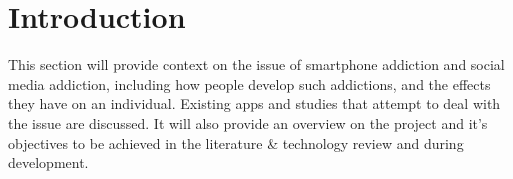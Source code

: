 \documentclass[12pt]{article}
\begin{document}
\begin{table}[H]
\caption[]{List of Abbreviations and Acronyms}
\label{tab:acronym-table}
\end{table}
\newpage


\section{Introduction}
This section will provide context on the issue of smartphone addiction and social media addiction, including how people develop such addictions, and the 
effects they have on an individual. Existing apps and studies that attempt to deal with the issue are discussed. It will also provide an overview on the project and it's objectives to be achieved in the literature 
\& technology review and during development.
\end{document}
